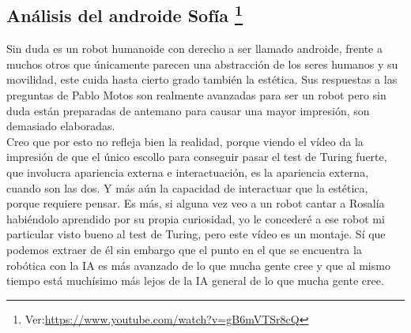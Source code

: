 \documentclass[final]{CSP}
\begin{document}
\subsection{Análisis del androide Sofía
\footnote{Ver:\url{https://www.youtube.com/watch?v=gB6mVTSr8cQ}}}

Sin duda es un robot humanoide con derecho a ser llamado androide, frente a muchos otros que
únicamente parecen una abstracción de los seres humanos y su movilidad, este cuida hasta cierto
grado también la estética. Sus respuestas a las preguntas de Pablo Motos son realmente avanzadas
para ser un robot pero sin duda están preparadas de antemano para causar una mayor impresión, 
son demasiado elaboradas.\\

Creo que por esto no refleja bien la realidad, porque viendo el vídeo da la impresión de que el
único escollo para conseguir pasar el test de Turing fuerte, que involucra apariencia externa
e interactuación, es la apariencia externa, cuando son las dos. Y más aún la capacidad de 
interactuar que la estética, porque requiere pensar. Es más, si alguna vez veo a un robot cantar
a Rosalía habiéndolo aprendido por su propia curiosidad, yo le concederé a ese robot mi particular
visto bueno al test de Turing, pero este vídeo es un montaje. Sí que podemos extraer de él sin 
embargo que el punto en el que se encuentra la robótica con la IA es más avanzado de lo que mucha
gente cree y que al mismo tiempo está muchísimo más lejos de la IA general de lo que mucha gente
cree.

%
\end{document}
